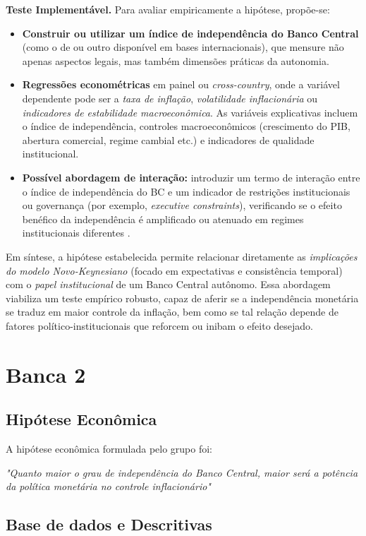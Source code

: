 \documentclass[a4paper,12pt]{article}[abnt2]
\begin{document}
\noindent
\textbf{Teste Implementável.} Para avaliar empiricamente a hipótese, propõe-se:
\begin{itemize}
    \item \textbf{Construir ou utilizar um índice de independência do Banco Central} (como o de \cite{adrian2024} ou outro disponível em bases internacionais), que mensure não apenas aspectos legais, mas também dimensões práticas da autonomia.
    \item \textbf{Regressões econométricas} em painel ou \emph{cross-country}, onde a variável dependente pode ser a \emph{taxa de inflação}, \emph{volatilidade inflacionária} ou \emph{indicadores de estabilidade macroeconômica}. As variáveis explicativas incluem o índice de independência, controles macroeconômicos (crescimento do PIB, abertura comercial, regime cambial etc.) e indicadores de qualidade institucional.
    \item \textbf{Possível abordagem de interação:} introduzir um termo de interação entre o índice de independência do BC e um indicador de restrições institucionais ou governança (por exemplo, \emph{executive constraints}), verificando se o efeito benéfico da independência é amplificado ou atenuado em regimes institucionais diferentes \cite{acemoglu2008}.
\end{itemize}

Em síntese, a hipótese estabelecida permite relacionar diretamente as \emph{implicações do modelo Novo-Keynesiano} (focado em expectativas e consistência temporal) com o \emph{papel institucional} de um Banco Central autônomo. Essa abordagem viabiliza um teste empírico robusto, capaz de aferir se a independência monetária se traduz em maior controle da inflação, bem como se tal relação depende de fatores político-institucionais que reforcem ou inibam o efeito desejado.

\newpage
\section{\textbf{Banca 2}}
\subsection{\textbf{Hipótese Econômica}}
A hipótese econômica formulada pelo grupo foi:

\textit{"Quanto maior o grau de independência do Banco Central, maior será a potência da política monetária no controle inflacionário"}

\subsection{\textbf{Base de dados e Descritivas}}
\end{document}
